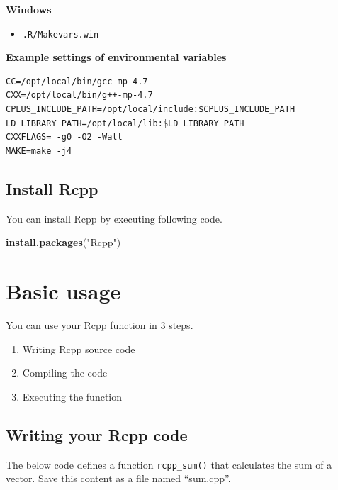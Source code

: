 \documentclass[]{book}
\newenvironment{Shaded}{\begin{snugshade}}{\end{snugshade}}
\newcommand{\KeywordTok}[1]{\textcolor[rgb]{0.13,0.29,0.53}{\textbf{#1}}}
\newcommand{\NormalTok}[1]{#1}
\newcommand{\StringTok}[1]{\textcolor[rgb]{0.31,0.60,0.02}{#1}}
\providecommand{\tightlist}{%
  \setlength{\itemsep}{0pt}\setlength{\parskip}{0pt}}
\begin{document}
\textbf{Windows}

\begin{itemize}
\tightlist
\item
  \texttt{.R/Makevars.win}
\end{itemize}

\textbf{Example settings of environmental variables}

\begin{verbatim}
CC=/opt/local/bin/gcc-mp-4.7
CXX=/opt/local/bin/g++-mp-4.7
CPLUS_INCLUDE_PATH=/opt/local/include:$CPLUS_INCLUDE_PATH
LD_LIBRARY_PATH=/opt/local/lib:$LD_LIBRARY_PATH
CXXFLAGS= -g0 -O2 -Wall
MAKE=make -j4
\end{verbatim}

\hypertarget{install-rcpp}{%
\section{Install Rcpp}\label{install-rcpp}}

You can install Rcpp by executing following code.

\begin{Shaded}
\begin{Highlighting}[]
\KeywordTok{install.packages}\NormalTok{(}\StringTok{"Rcpp"}\NormalTok{)}
\end{Highlighting}
\end{Shaded}

\hypertarget{basic-usage}{%
\chapter{Basic usage}\label{basic-usage}}

You can use your Rcpp function in 3 steps.

\begin{enumerate}
\def\labelenumi{\arabic{enumi}.}
\tightlist
\item
  Writing Rcpp source code
\item
  Compiling the code
\item
  Executing the function
\end{enumerate}

\hypertarget{writing-your-rcpp-code}{%
\section{Writing your Rcpp code}\label{writing-your-rcpp-code}}

The below code defines a function \texttt{rcpp\_sum()} that calculates the sum of a vector. Save this content as a file named ``sum.cpp''.
\end{document}
